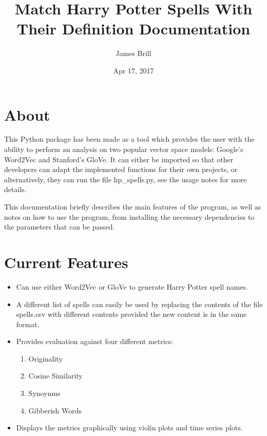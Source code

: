 \documentclass[letterpaper,10pt,english]{sphinxmanual}
\title{Match Harry Potter Spells With Their Definition Documentation}
\date{Apr 17, 2017}
\author{James Brill}
\begin{document}
\maketitle
\sphinxtableofcontents
{}\label{\detokenize{index::doc}}



\chapter{About}
\label{\detokenize{index:about}}\label{\detokenize{index:welcome-to-match-hp-spells-with-their-definition-s-documentation}}
This Python package has been made as a tool which provides the user with the ability to perform an analysis on two popular vector space models: Google's Word2Vec and Stanford's GloVe. It can either be imported so that other developers can adapt the implemented functions for their own projects, or alternatively, they can run the file hp\_spells.py, see the usage notes for more details.

This documentation briefly describes the main features of the program, as well as notes on how to use the program, from installing the necessary dependencies to the parameters that can be passed.


\chapter{Current Features}
\label{\detokenize{index:current-features}}\begin{itemize}
\item {} 
Can use either Word2Vec or GloVe to generate Harry Potter spell names.

\item {} 
A different list of spells can easily be used by replacing the contents of the file \sphinxquotedblleft{}spells.csv\sphinxquotedblright{} with different contents provided the new content is in the same format.

\item {} 
Provides evaluation against four different metrics:
\begin{enumerate}
\item {} 
Originality

\item {} 
Cosine Similarity

\item {} 
Synoynms

\item {} 
Gibberish Words

\end{enumerate}

\item {} 
Displays the metrics graphically using violin plots and time series plots.

\end{itemize}
\end{document}
